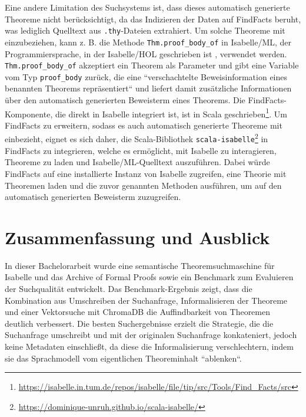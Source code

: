 \documentclass[12pt,letterpaper]{article} %
\begin{document}
Eine andere Limitation des Suchsystems ist, dass dieses automatisch generierte Theoreme nicht berücksichtigt, da das Indizieren der Daten auf FindFacts beruht, was lediglich Quelltext aus \texttt{.thy}-Dateien extrahiert.
Um solche Theoreme mit einzubeziehen, kann z. B. die Methode \texttt{Thm.proof\_body\_of} \citep[S. 94]{wenzel_isabelleisar_implementation} in Isabelle/ML, der Programmiersprache, in der Isabelle/HOL geschrieben ist \citep{wenzel_isabelleisar_implementation}, verwendet werden.
\texttt{Thm.proof\_body\_of} akzeptiert ein Theorem als Parameter und gibt eine Variable vom Typ \texttt{proof\_body} zurück, die eine ``verschachtelte Beweisinformation eines benannten Theorems repräsentiert`` \citep[S. 94]{wenzel_isabelleisar_implementation} und liefert damit zusätzliche Informationen über den automatisch generierten Beweisterm eines Theorems.
Die FindFacts-Komponente, die direkt in Isabelle integriert ist, ist in Scala geschrieben\footnote{\url{https://isabelle.in.tum.de/repos/isabelle/file/tip/src/Tools/Find_Facts/src}}.
Um FindFacts zu erweitern, sodass es auch automatisch generierte Theoreme mit einbezieht, eignet es sich daher, die Scala-Bibliothek \texttt{scala-isabelle}\footnote{\url{https://dominique-unruh.github.io/scala-isabelle/}} in FindFacts zu integrieren, welche es ermöglicht, mit Isabelle zu interagieren, Theoreme zu laden und Isabelle/ML-Quelltext auszuführen.
Dabei würde FindFacts auf eine installierte Instanz von Isabelle zugreifen, eine Theorie mit Theoremen laden und die zuvor genannten Methoden ausführen, um auf den automatisch generierten Beweisterm zuzugreifen.

\section{Zusammenfassung und Ausblick}

In dieser Bachelorarbeit wurde eine semantische Theoremsuchmaschine für Isabelle und das Archive of Formal Proofs sowie ein Benchmark zum Evaluieren der Suchqualität entwickelt.
Das Benchmark-Ergebnis zeigt, dass die Kombination aus Umschreiben der Suchanfrage, Informalisieren der Theoreme und einer Vektorsuche mit ChromaDB die Auffindbarkeit von Theoremen deutlich verbessert.
Die besten Suchergebnisse erzielt die Strategie, die die Suchanfrage umschreibt und mit der originalen Suchanfrage konkateniert, jedoch keine Metadaten einschließt, da diese die Informalisierung verschlechtern, indem sie das Sprachmodell vom eigentlichen Theoreminhalt ``ablenken``.
\end{document}
